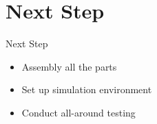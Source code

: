 \documentclass[12pt]{beamer}
\begin{document}
\section{Next Step}
\begin{frame}{Next Step}
    \begin{itemize}
        \item Assembly all the parts
        \item Set up simulation environment
        \item Conduct all-around testing
    \end{itemize}
\end{frame}

\section*{}
\end{document}
